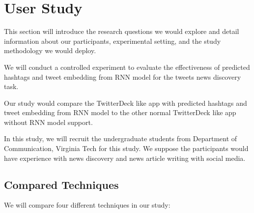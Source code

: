 \section{User Study}

This section will introduce the research questions we would explore and detail information about our participants, experimental setting, and the study methodology we would deploy. 

We will conduct a controlled experiment to evaluate the effectiveness of predicted hashtags and tweet embedding from RNN model for the tweets news discovery task.    

Our study would compare the TwitterDeck like app with predicted hashtags and tweet embedding from RNN model to the other normal TwitterDeck like app without RNN model support.  

In this study, we will recruit the undergraduate students from Department of Communication, Virginia Tech for this study. We suppose the participants would have experience with news discovery and news article writing with social media.

\subsection{Compared Techniques}

We will compare four different techniques in our study:

